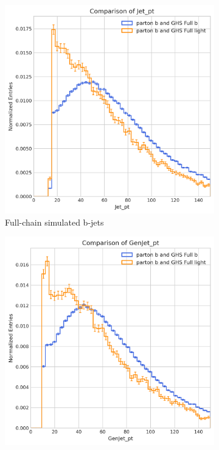 \documentclass[10pt,twocolumn]{article}
\begin{document}
\begin{figure}[!htbp]
    \centering
    \begin{subfigure}[t]{0.48\textwidth}
        \centering
        \includegraphics[width=\textwidth]{images/compare_pt_GHSFull_light_vs_b_filter_partonFlavour_5.png}
        \caption{Full-chain simulated b-jets}
        \label{fig:pt_b_parton_full}
    \end{subfigure}
    \hfill
    \begin{subfigure}[t]{0.48\textwidth}
        \centering
        \includegraphics[width=\textwidth]{images/compare_GenJet_pt_GHSFull_light_vs_b_filter_partonFlavour_5.png}

\end{subfigure}
\end{figure}
\end{document}
